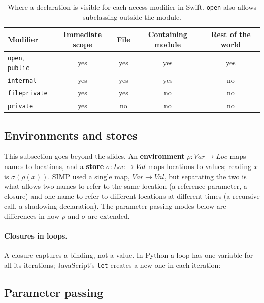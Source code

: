 \begin{table}[h]
\centering
\small
\begin{tabular}{l c c c c}
  \toprule
  Modifier & Immediate scope & File & Containing module & Rest of the world \\
  \midrule
  \texttt{open}, \texttt{public} & yes & yes & yes & yes \\
  \texttt{internal}               & yes & yes & yes & no \\
  \texttt{fileprivate}            & yes & yes & no  & no \\
  \texttt{private}                & yes & no  & no  & no \\
  \bottomrule
\end{tabular}
\caption{Where a declaration is visible for each access modifier in Swift. \texttt{open} also allows subclassing outside the module.}
\label{tab:access}
\end{table}

\subsection{Environments and stores}

This subsection goes beyond the slides. An \textbf{environment}
$\rho : \mathit{Var} \to \mathit{Loc}$ maps names to locations, and a \textbf{store}
$\sigma : \mathit{Loc} \to \mathit{Val}$ maps locations to values; reading $x$ is
$\sigma(\rho(x))$. SIMP used a single map, $\mathit{Var} \to \mathit{Val}$, but separating
the two is what allows two names to refer to the same location (a reference
parameter, a closure) and one name to refer to different locations at
different times (a recursive call, a shadowing declaration). The parameter
passing modes below are differences in how $\rho$ and $\sigma$ are extended.

\paragraph{Closures in loops.} A closure captures a binding, not a value. In
Python a loop has one variable for all its iterations; JavaScript's
\texttt{let} creates a new one in each iteration:

\subsection{Parameter passing}

